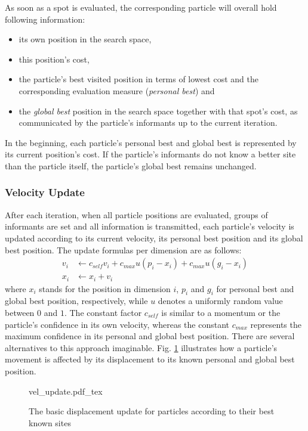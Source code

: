 As soon as a spot is evaluated, the corresponding particle will overall hold following information:
\begin{itemize}
	\item its own position in the search space,
	\item this position's cost,
	\item the particle's best visited position in terms of lowest cost and the corresponding evaluation measure (\textit{personal best}) and
	\item the \textit{global best} position in the search space together with that spot's cost, as communicated by the particle's informants up to the current iteration.
\end{itemize}
In the beginning, each particle's personal best and global best is represented by its current position's cost.
If the particle's informants do not know a better site than the particle itself, the particle's global best remains unchanged.

\subsubsection{Velocity Update}
After each iteration, when all particle positions are evaluated, groups of informants are set and all information is transmitted, each particle's velocity is updated according to its current velocity, its personal best position and its global best position.
The update formulas per dimension are as follows:
\begin{align}
	v_i&\gets c_{self}v_i + c_{max}u(p_i - x_i) + c_{max}u(g_i - x_i)\\
	x_i&\gets x_i + v_i
\end{align}
where $x_i$ stands for the position in dimension $i$, $p_i$ and $g_i$ for personal best and global best position, respectively, while $u$ denotes a uniformly random value between $0$ and $1$.
The constant factor $c_{self}$ is similar to a momentum or the particle's confidence in its own velocity, whereas the constant $c_{max}$ represents the maximum confidence in its personal and global best position.
There are several alternatives to this approach imaginable.
Fig. \ref{fig:particle} illustrates how a particle's movement is affected by its displacement to its known personal and global best position.
\begin{figure}
	\centering
	\def\svgwidth{0.7\columnwidth}
         {vel_update.pdf_tex}
         \caption{The basic displacement update for particles according to their best known sites}
         \label{fig:particle}
\end{figure}

